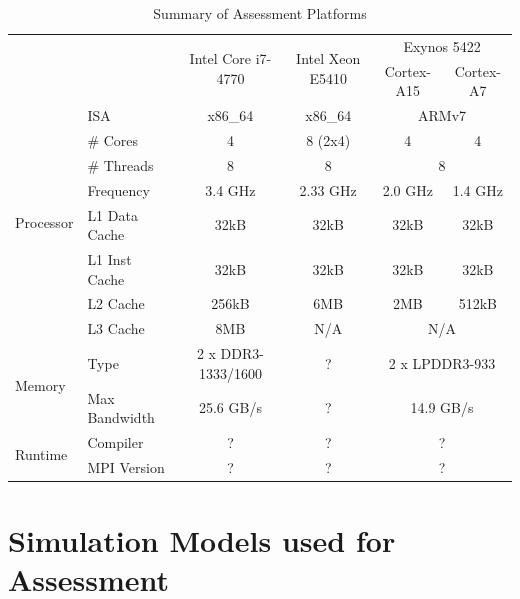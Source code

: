 \documentclass[11pt]{book}
\begin{document}
\begin{center}\begin{table}
    \begin{tabular}{|| l | l | c | c | c c ||}
    \hline
        \multicolumn{2}{|l|}{} & \multirow{2}{*}{Intel Core i7-4770} &
            \multirow{2}{*}{Intel Xeon E5410} & \multicolumn{2}{c||}{Exynos 5422} \\ \cline{5-6}
        \multicolumn{2}{|l|}{} & & & Cortex-A15 & Cortex-A7 \\ [0.5ex]
        \hline\hline
        \multirow{8}{*}{Processor}
            & ISA           & x86\_64   & x86\_64   & \multicolumn{2}{c||}{ARMv7} \\
            & \# Cores      & 4         & 8 (2x4)   & 4         & 4 \\
            & \# Threads    & 8         & 8         & \multicolumn{2}{c||}{8} \\
            & Frequency     & 3.4 GHz   & 2.33 GHz  & 2.0 GHz   & 1.4 GHz \\
            & L1 Data Cache & 32kB      & 32kB      & 32kB      & 32kB \\
            & L1 Inst Cache & 32kB      & 32kB      & 32kB      & 32kB \\
            & L2 Cache      & 256kB     & 6MB       & 2MB       & 512kB\\
            & L3 Cache      & 8MB       & N/A       & \multicolumn{2}{c||}{N/A} \\
        \hline
        \multirow{2}{*}{Memory}
            & Type          & 2 x DDR3-1333/1600    & ? & \multicolumn{2}{c||}{2 x LPDDR3-933} \\
            & Max Bandwidth & 25.6 GB/s             & ? & \multicolumn{2}{c||}{14.9 GB/s} \\
        \hline
        \multirow{2}{*}{Runtime}
            & Compiler      & ? & ? & \multicolumn{2}{c||}{?} \\
            & MPI Version   & ? & ? & \multicolumn{2}{c||}{?} \\
        \hline
    \end{tabular}
    \caption{Summary of Assessment Platforms}\label{platform_table}
\end{table}\end{center}

\section{Simulation Models used for Assessment}
\end{document}
